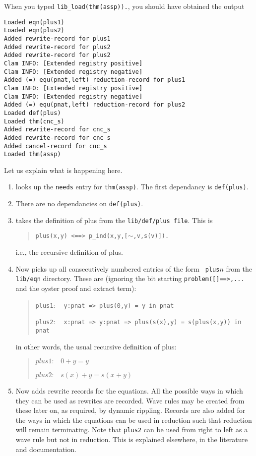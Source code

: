 \documentclass{article}
\begin{document}
When you typed {\tt lib\_load(thm(assp)).}, you should have obtained the
output
%
\begin{verbatim}
Loaded eqn(plus1)
Loaded eqn(plus2)
Added rewrite-record for plus1
Added rewrite-record for plus2
Added rewrite-record for plus2
Clam INFO: [Extended registry positive] 
Clam INFO: [Extended registry negative] 
Added (=) equ(pnat,left) reduction-record for plus1
Clam INFO: [Extended registry positive] 
Clam INFO: [Extended registry negative] 
Added (=) equ(pnat,left) reduction-record for plus2
Loaded def(plus)
Loaded thm(cnc_s)
Added rewrite-record for cnc_s
Added rewrite-record for cnc_s
Added cancel-record for cnc_s
Loaded thm(assp)
\end{verbatim}
%
Let us explain what is happening here.
%
\begin{enumerate}

\item
\clam looks up the {\tt needs} entry for {\tt thm(assp)}. The first
dependancy is {\tt def(plus)}.

\item There are no dependancies on {\tt def(plus)}.
\item
\clam takes the definition of plus from the {\tt lib/def/plus file}.
This is
%
\begin{verse}
{\tt plus(x,y) <==> p\_ind(x,y,[$\sim$,v,s(v)]).}
\end{verse}
%
i.e., the recursive definition of plus.

\item
Now \clam picks up all consecutively numbered entries of the form {\tt
plus$n$} from the {\tt lib/eqn} directory. These are (ignoring the bit
starting {\tt problem([]==>,...}  and the oyster proof and extract
term):
%
\begin{verse}
{\tt plus1}: $ \; \; $ {\tt y:pnat => plus(0,y) = y in pnat}

{\tt plus2}: $ \; \; $
{\tt x:pnat => y:pnat => plus(s(x),y) = s(plus(x,y)) in pnat}
\end{verse}
%
in other words, the usual recursive definition of plus:
%
\begin{verse}
$ plus1: \; \; \; 0 + y = y$

$ plus2: \; \; \; s(x) + y = s(x+y)$
\end{verse}

\item
Now \clam adds rewrite records for the equations. All the possible ways
in which they can be used as rewrites are recorded. Wave rules may be created
from these later on, as required, by dynamic rippling. Records are also added
for the ways in which the equations can be used in reduction such that
reduction will remain terminating. Note that {\tt plus2} can be used from
right to left as a wave rule but not in reduction.
This is explained elsewhere, in the literature and documentation.


\end{enumerate}
\end{document}

